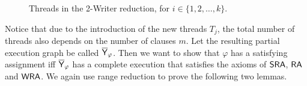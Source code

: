 \begin{figure}[t]

\caption{Threads in the 2-Writer reduction, for
$i\in\{1,2,\ldots,k\}$.}
\label{fig:two-writer}
\end{figure}


Notice that due to the introduction of the new threads $T_j$, the total number of threads also depends on the number of clauses $m$. Let the resulting partial execution graph be called $\overline{\mathsf{\color{black}Y}}_\varphi$. Then we want to show that $\varphi$ has a satisfying assignment iff $\overline{\mathsf{\color{black}Y}}_\varphi$ has a complete execution that satisfies the axioms of $\mathsf{SRA}$, $\mathsf{RA}$ and $\mathsf{WRA}$. We again use range reduction to prove the following two lemmas.

